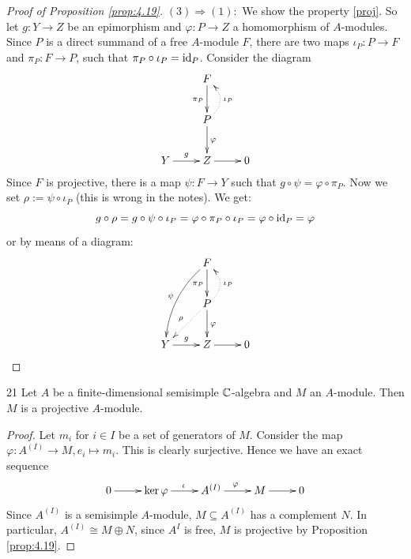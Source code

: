 \documentclass[twoside = false,	%
		headsepline,		%
		parskip = true,
		]{scrbook}						%
\begin{document}
\begin{proof}[Proof of Proposition \ref{prop:4.19}]
        $(3) \Rightarrow (1):$ We show the property \eqref{proj}. So let $g: Y \to Z$ be an epimorphism and $\varphi: P \to Z$ a homomorphism of $A$-modules. Since $P$ is a direct summand of a free $A$-module $F$, there are two maps $\iota_P: P \to F$ and $\pi_P: F \to P$, such that $\pi_P \circ \iota_P = \mathrm{id}_P$. Consider the diagram
        \begin{equation*}
        \xymatrix {
            & F \ar[d]_{\pi_P} \\
            & P \ar@/_1.0pc/@{.>}[u]_{\iota_P} \ar[d]^{\varphi} \\
            Y \ar[r]^g & Z \ar[r] & 0
        }
        \end{equation*}
        Since $F$ is projective, there is a map $\psi: F \to Y$ such that $g \circ \psi = \varphi \circ \pi_P$. Now we set $\rho := \psi \circ \iota_P$ (this is wrong in the notes). We get:
        \begin{equation*}
            g \circ \rho = g \circ \psi \circ \iota_P = \varphi \circ \pi_P \circ \iota_P = \varphi \circ \mathrm{id}_P = \varphi
        \end{equation*}
        or by means of a diagram:
        \begin{equation*}
        \xymatrix {
            & F \ar[d]_{\pi_P} \ar@/_0.79pc/[ddl]_{\psi} \\
            & P \ar@/_1.0pc/@{.>}[u]_{\iota_P} \ar[d]^{\varphi} \ar@{.>}[dl]_{\rho} \\
            Y \ar[r]^g & Z \ar[r] & 0
        }
        \end{equation*}
    \end{proof}

    \begin{exercise}{}{21}
        Let $A$ be a finite-dimensional semisimple $\mathbb C$-algebra and $M$ an $A$-module. Then $M$ is a projective $A$-module.
    \end{exercise}

    \begin{proof}
        Let $m_i$ for $i \in I$ be a set of generators of $M$. Consider the map $\varphi: A^{(I)} \to M, e_i \mapsto m_i$. This is clearly surjective. Hence we have an exact sequence
        \begin{equation*}
        \xymatrix {
            0 \ar[r]& \ker \varphi \ar[r]^\iota & A^{(I)} \ar[r]^\varphi& M \ar[r]& 0
        }
        \end{equation*}
        Since $A^{(I)}$ is a semisimple $A$-module, $M \subseteq A^{(I)}$ has a complement $N$. In particular, $A^{(I)} \cong M \oplus N$, since $A^I$ is free, $M$ is projective by Proposition \ref{prop:4.19}.
    \end{proof}
\end{document}
